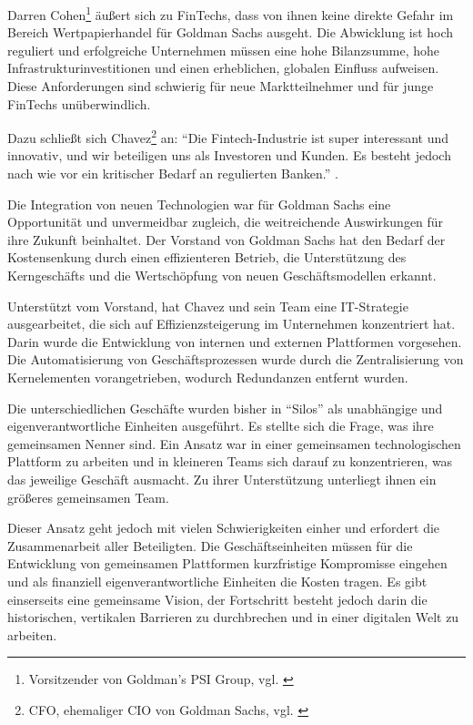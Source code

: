 Darren Cohen\footnote{Vorsitzender von Goldman's PSI Group, vgl. \cite{Gupta:2017}} äußert sich zu FinTechs, dass von ihnen keine direkte Gefahr im Bereich Wertpapierhandel für Goldman Sachs ausgeht. Die Abwicklung ist hoch reguliert und erfolgreiche Unternehmen müssen eine hohe Bilanzsumme, hohe Infrastrukturinvestitionen und einen erheblichen, globalen Einfluss aufweisen. Diese Anforderungen sind schwierig für neue Marktteilnehmer und für junge FinTechs unüberwindlich. 

Dazu schließt sich Chavez\footnote{\ac{CFO}, ehemaliger \ac{CIO} von Goldman Sachs, vgl. \cite{Gupta:2017}} an: \enquote{Die Fintech-Industrie ist super interessant und innovativ, und wir beteiligen uns als Investoren und Kunden. Es besteht jedoch nach wie vor ein kritischer Bedarf an regulierten Banken.} \cite{Chavez:2017}.

Die Integration von neuen Technologien war für Goldman Sachs eine Opportunität und unvermeidbar zugleich, die weitreichende Auswirkungen für ihre Zukunft beinhaltet.
Der Vorstand von Goldman Sachs hat den Bedarf der Kostensenkung durch einen effizienteren Betrieb, die Unterstützung des Kerngeschäfts und die Wertschöpfung von neuen Geschäftsmodellen erkannt.

Unterstützt vom Vorstand, hat Chavez und sein Team eine IT-Strategie ausgearbeitet, die sich auf Effizienzsteigerung im Unternehmen konzentriert hat. Darin wurde die Entwicklung von internen und externen Plattformen vorgesehen. Die Automatisierung von Geschäftsprozessen wurde durch die Zentralisierung von Kernelementen vorangetrieben, wodurch Redundanzen entfernt wurden.

Die unterschiedlichen Geschäfte wurden bisher in \enquote{Silos} als unabhängige und eigenverantwortliche Einheiten ausgeführt. Es stellte sich die Frage, was ihre gemeinsamen Nenner sind. Ein Ansatz war in einer gemeinsamen technologischen Plattform zu arbeiten und in kleineren Teams sich darauf zu konzentrieren, was das jeweilige Geschäft ausmacht. Zu ihrer Unterstützung unterliegt ihnen ein größeres gemeinsamen Team.

Dieser Ansatz geht jedoch mit vielen Schwierigkeiten einher und erfordert die Zusammenarbeit aller Beteiligten. Die Geschäftseinheiten müssen für die Entwicklung von gemeinsamen Plattformen kurzfristige Kompromisse eingehen und als finanziell eigenverantwortliche Einheiten die Kosten tragen. Es gibt einserseits eine gemeinsame Vision, der Fortschritt besteht jedoch darin die historischen, vertikalen Barrieren zu durchbrechen und in einer digitalen Welt zu arbeiten.

